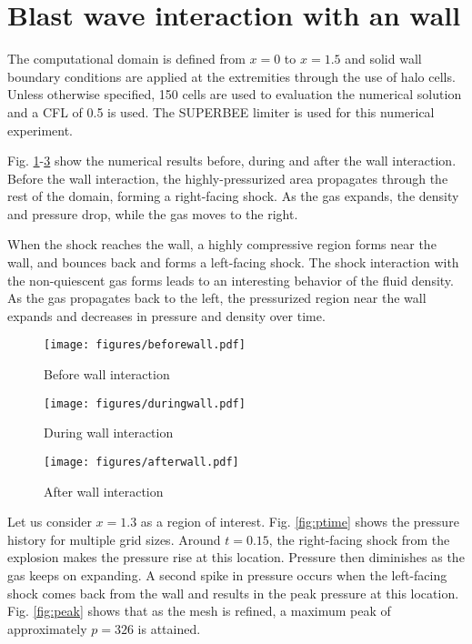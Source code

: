 \documentclass[letterpaper,12pt,]{article}
\begin{document}
\section{Blast wave interaction with an wall}

The computational domain is defined from $x = 0$ to $x=1.5$ and solid wall boundary conditions are applied at the extremities through the use of halo cells.
Unless otherwise specified, 150 cells are used to evaluation the numerical solution and a CFL of 0.5 is used.
The SUPERBEE limiter is used for this numerical experiment.

Fig. \ref{fig:bwall}-\ref{fig:awall} show the numerical results before, during and after the wall interaction.
Before the wall interaction, the highly-pressurized area propagates through the rest of the domain, forming a right-facing shock.
As the gas expands, the density and pressure drop, while the gas moves to the right.

When the shock reaches the wall, a highly compressive region forms near the wall, and bounces back and forms a left-facing shock.
The shock interaction with the non-quiescent gas forms leads to an interesting behavior of the fluid density.
As the gas propagates back to the left, the pressurized region near the wall expands and decreases in pressure and density over time.

\begin{figure}[htb]%
    \texttt{[image: figures/beforewall.pdf]}
    \caption{Before wall interaction}
    \label{fig:bwall}
\end{figure}

\begin{figure}[htb]%
    \texttt{[image: figures/duringwall.pdf]}
    \caption{During wall interaction}
    \label{fig:dwall}
\end{figure}
\begin{figure}[htb]%
    \texttt{[image: figures/afterwall.pdf]}
    \caption{After wall interaction}
    \label{fig:awall}
\end{figure}

Let us consider $x = 1.3$ as a region of interest. Fig. \ref{fig:ptime} shows the pressure history for multiple grid sizes.
Around $t = 0.15$, the right-facing shock from the explosion makes the pressure rise at this location.
Pressure then diminishes as the gas keeps on expanding.
A second spike in pressure occurs when the left-facing shock comes back from the wall and results in the peak pressure at this location.
Fig. \ref{fig:peak} shows that as the mesh is refined, a maximum peak of approximately $p=326$ is attained.
\end{document}
